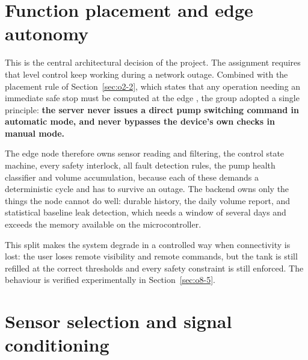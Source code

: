 \section{Function placement and edge autonomy}
\label{sec:o3-2}

This is the central architectural decision of the project. The assignment requires that level control keep working during a network outage. Combined with the placement rule of Section~\ref{sec:o2-2}, which states that any operation needing an immediate safe stop must be computed at the edge \cite{slide01}, the group adopted a single principle: \textbf{the server never issues a direct pump switching command in automatic mode, and never bypasses the device's own checks in manual mode.}

The edge node therefore owns sensor reading and filtering, the control state machine, every safety interlock, all fault detection rules, the pump health classifier and volume accumulation, because each of these demands a deterministic cycle and has to survive an outage. The backend owns only the things the node cannot do well: durable history, the daily volume report, and statistical baseline leak detection, which needs a window of several days and exceeds the memory available on the microcontroller.

This split makes the system degrade in a controlled way when connectivity is lost: the user loses remote visibility and remote commands, but the tank is still refilled at the correct thresholds and every safety constraint is still enforced. The behaviour is verified experimentally in Section~\ref{sec:o8-5}.

\section{Sensor selection and signal conditioning}
\label{sec:o3-3}

